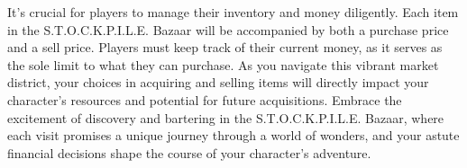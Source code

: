 It's crucial for players to manage their inventory and money diligently. Each item in the S.T.O.C.K.P.I.L.E. Bazaar will be accompanied by both a purchase price and a sell price. Players must keep track of their current money, as it serves as the sole limit to what they can purchase. As you navigate this vibrant market district, your choices in acquiring and selling items will directly impact your character's resources and potential for future acquisitions. Embrace the excitement of discovery and bartering in the S.T.O.C.K.P.I.L.E. Bazaar, where each visit promises a unique journey through a world of wonders, and your astute financial decisions shape the course of your character's adventure.
